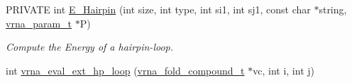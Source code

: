 \begin{DoxyCompactItemize}
\item 
P\+R\+I\+V\+A\+TE int \hyperlink{group__loops_gadf943ee9a45b7f4cee9192c06210dace}{E\+\_\+\+Hairpin} (int size, int type, int si1, int sj1, const char $\ast$string, \hyperlink{group__energy__parameters_ga8a69ca7d787e4fd6079914f5343a1f35}{vrna\+\_\+param\+\_\+t} $\ast$P)
\begin{DoxyCompactList}\small\item\em Compute the Energy of a hairpin-\/loop. \end{DoxyCompactList}\item 
int \hyperlink{group__loops_gad3b92453a6b501856eec8fae39f3235d}{vrna\+\_\+eval\+\_\+ext\+\_\+hp\+\_\+loop} (\hyperlink{group__fold__compound_ga1b0cef17fd40466cef5968eaeeff6166}{vrna\+\_\+fold\+\_\+compound\+\_\+t} $\ast$vc, int i, int j)\hypertarget{group__loops_gad3b92453a6b501856eec8fae39f3235d}{}\label{group__loops_gad3b92453a6b501856eec8fae39f3235d}


\end{DoxyCompactItemize}
